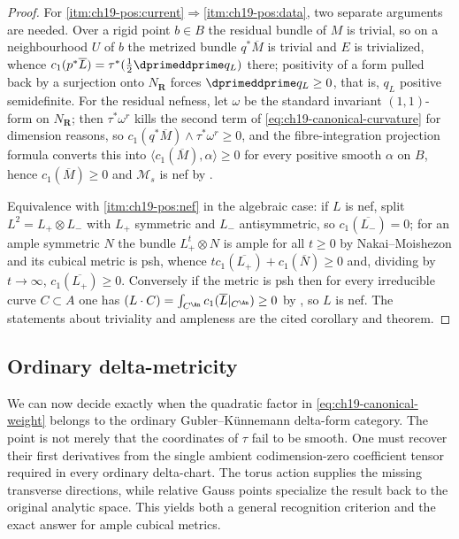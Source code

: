 \begin{proof}
For \cref{itm:ch19-pos:current}$\Rightarrow$\cref{itm:ch19-pos:data}, two
separate arguments are needed.  Over a rigid point $b\in B$ the residual
bundle of $M$ is trivial, so on a neighbourhood $U$ of $b$ the metrized
bundle $q^*\overline M$ is trivial and $E$ is trivialized, whence
$c_1(p^*\overline L)=\tau^*(\tfrac12\dprimeddprime q_L)$ there; positivity
of a form pulled back by a surjection onto $N_{\mathbf R}$ forces
$\dprimeddprime q_L\geq0$, that is, $q_L$ positive semidefinite.  For the
residual nefness, let $\omega$ be the standard invariant $(1,1)$-form on
$N_{\mathbf R}$; then $\tau^*\omega^r$ kills the second term of
\eqref{eq:ch19-canonical-curvature} for dimension reasons, so
$c_1(q^*\overline M)\wedge\tau^*\omega^r\geq0$, and the fibre-integration
projection formula  converts this into
$\langle c_1(\overline M),\alpha\rangle\geq0$ for every positive smooth
$\alpha$ on $B$, hence $c_1(\overline M)\geq0$ and $\mathcal M_s$ is nef by
.

Equivalence with \cref{itm:ch19-pos:nef} in the algebraic case: if $L$ is nef,
split $L^2=L_+\otimes L_-$ with $L_+$ symmetric and $L_-$ antisymmetric, so
$c_1(\overline{L_-})=0$; for an ample symmetric $N$ the bundle
$L_+^{t}\otimes N$ is ample for all $t\geq0$ by Nakai--Moishezon and its
cubical metric is psh, whence $tc_1(\overline{L_+})+c_1(\overline N)\geq0$
and, dividing by $t\to\infty$, $c_1(\overline{L_+})\geq0$.  Conversely if
the metric is psh then for every irreducible curve $C\subset A$ one has
$(L\cdot C)=\int_{C^{\An}}c_1(\overline L|_{C^{\An}})\geq0$ by
, so $L$ is nef.  The statements about
triviality and ampleness are the cited corollary and theorem.
\end{proof}

\subsection{Ordinary delta-metricity}
\label{sec:ch19-canonical-delta-metricity}

We can now decide exactly when the quadratic factor in
\eqref{eq:ch19-canonical-weight} belongs to the ordinary
Gubler--K\"unnemann delta-form category.  The point is not merely that the
coordinates of $\tau$ fail to be smooth.  One must recover their first
derivatives from the single ambient codimension-zero coefficient tensor
required in every ordinary delta-chart.  The torus action supplies the
missing transverse directions, while relative Gauss points specialize the
result back to the original analytic space.  This yields both a general
recognition criterion and the exact answer for ample cubical metrics.

